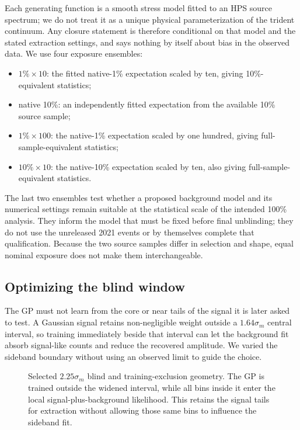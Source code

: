 Each generating function is a smooth stress model fitted to an HPS source spectrum;
we do not treat it as a unique physical parameterization of the trident continuum.
Any closure statement is therefore conditional on that model and the stated
extraction settings, and says nothing by itself about bias in the observed data. We
use four exposure ensembles:
\begin{itemize}
\item $1\%\times10$: the fitted native-1\% expectation scaled by ten, giving
10\%-equivalent statistics;
\item native 10\%: an independently fitted expectation from the available
10\% source sample;
\item $1\%\times100$: the native-1\% expectation scaled by one hundred,
giving full-sample-equivalent statistics;
\item $10\%\times10$: the native-10\% expectation scaled by ten, also
giving full-sample-equivalent statistics.
\end{itemize}
The last two ensembles test whether a proposed background model and its
numerical settings remain suitable at the statistical scale of the intended
100\% analysis. They inform the model that must be fixed before final
unblinding; they do not use the unreleased 2021 events or by themselves
complete that qualification. Because the two source samples differ in
selection and shape, equal nominal exposure does not make them interchangeable.

\subsection{Optimizing the blind window}
\label{subsec:v491-guard-band-construction}

The GP must not learn from the core or near tails of the signal it is later asked to
test. A Gaussian signal retains non-negligible weight outside a $1.64\sigma_m$
central interval, so training immediately beside that interval can let the background
fit absorb signal-like counts and reduce the recovered amplitude. We varied the
sideband boundary without using an observed limit to guide the choice.

\begin{figure}[htbp]
\centering
{}
\caption{Selected $2.25\sigma_m$ blind and training-exclusion geometry.  The GP is
trained outside the widened interval, while all bins inside it enter the local
signal-plus-background likelihood.  This retains the signal tails for extraction
without allowing those same bins to influence the sideband fit.}
\label{fig:v491-blind225-cartoon}
\end{figure}


